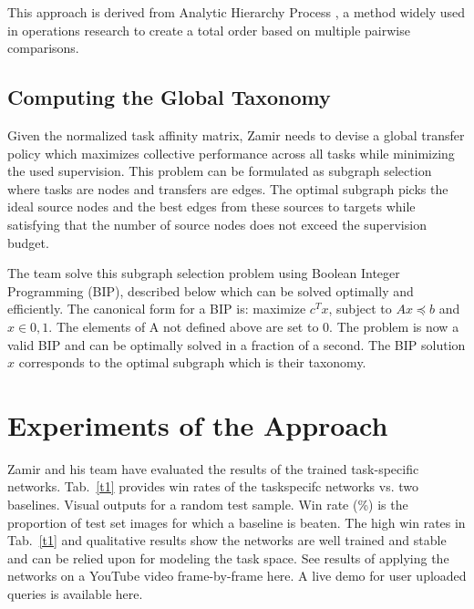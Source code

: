 \documentclass[10pt,twocolumn,letterpaper]{article}
\begin{document}
This approach is derived from Analytic Hierarchy Process \cite{saaty1987analytic}, a method widely used in operations research to create a total order based on multiple pairwise comparisons.

\subsection{Computing the Global Taxonomy}

Given the normalized task affinity matrix, Zamir needs to devise a global transfer policy which maximizes collective performance across all tasks while minimizing the used supervision. This problem can be formulated as subgraph selection where tasks are nodes and transfers are edges. The optimal subgraph picks the ideal source nodes and the best edges from these sources to targets while satisfying that the number of source nodes does not exceed the supervision budget. 

The team solve this subgraph selection problem using Boolean Integer Programming (BIP), described below which can be solved optimally and efficiently. The canonical form for a BIP is: maximize $c^Tx$, subject to $Ax\preceq b$ and $x\in {0,1}$. The elements of A not defined above are set to 0. The problem is now a valid BIP and can be optimally solved in a fraction of a second. The BIP solution $\hat{x}$ corresponds to the optimal subgraph which is their taxonomy.

\section{Experiments of the Approach}

Zamir and his team have evaluated the results of the trained task-specific networks. Tab.~\ref{t1} provides win rates of the taskspecifc networks vs. two baselines. Visual outputs for a random test sample. Win rate (\%) is the proportion of test set images for which a baseline is beaten. The high win rates in Tab.~\ref{t1} and qualitative results show the networks are well trained and stable and can be relied upon for modeling the task space. See results of applying the networks on a YouTube video frame-by-frame here. A live demo for user uploaded queries is available here.
\end{document}
